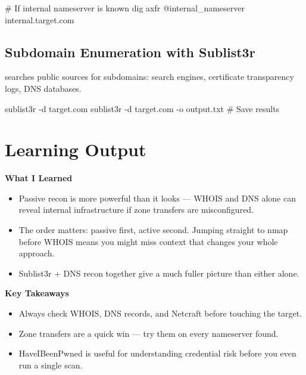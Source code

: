 \begin{takebox}
\begin{whybox}
\begin{notebox}
\begin{termbox}
# If internal nameserver is known
dig axfr @internal_nameserver internal.target.com
\end{termbox}


\subsection{Subdomain Enumeration with Sublist3r}

 searches public sources for subdomains: search engines, certificate
transparency logs, DNS databases.

\begin{termbox}
sublist3r -d target.com
sublist3r -d target.com -o output.txt    # Save results
\end{termbox}


\section{Learning Output}
\label{sec:info_gathering_learning}

\begin{takebox}
\textbf{What I Learned}
\begin{itemize}
  \item Passive recon is more powerful than it looks --- WHOIS and DNS alone can
        reveal internal infrastructure if zone transfers are misconfigured.
  \item The order matters: passive first, active second. Jumping straight to nmap
        before WHOIS means you might miss context that changes your whole approach.
  \item Sublist3r + DNS recon together give a much fuller picture than either alone.
\end{itemize}

\textbf{Key Takeaways}
\begin{itemize}
  \item Always check WHOIS, DNS records, and Netcraft before touching the target.
  \item Zone transfers are a quick win --- try them on every nameserver found.
  \item HaveIBeenPwned is useful for understanding credential risk before you even
        run a single scan.
\end{itemize}


\end{takebox}
\end{notebox}
\end{whybox}
\end{takebox}

